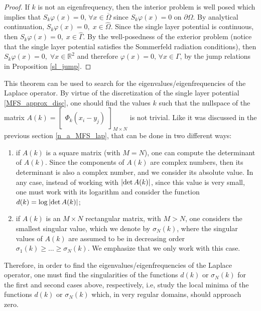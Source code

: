 \begin{proof}
    If \(k\) is not an eigenfrequency, then the interior problem is well posed which implies that \(S_k\varphi(x) = 0, \, \forall x \in \overline{\Omega}\) since \(S_k\varphi(x) = 0\) on \(\partial\Omega\). By analytical continuation, \(S_k\varphi(x) = 0, \; x \in \hat{\Omega}\). Since the single layer potential is continuous, then \(S_k\varphi(x) = 0, \; x \in \hat{\Gamma}\). By the well-posedness of the exterior problem (notice that the single layer potential satisfies the Sommerfeld radiation conditions), then \(S_k\varphi(x) = 0, \; \forall x \in \mathbb{R}^2\) and therefore \(\varphi(x) = 0, \, \forall x \in \Gamma\), by the jump relations in Proposition \ref{sl_jump}.
\end{proof}

This theorem can be used to search for the eigenvalues/eigenfrequencies of the Laplace operator. By virtue of the discretization of the single layer potential \eqref{MFS_approx_disc}, one should find the values \(k\) such that the nullspace of the matrix \(A(k) = \begin{bmatrix}
    \Phi_k(x_i - y_j)
\end{bmatrix}_{M \times N}\) is not trivial. Like it was discussed in the previous section \ref{n_a_MFS_lap}, that can be done in two different ways:
\begin{enumerate}
    \item if \(A(k)\) is a square matrix (with \(M=N\)), one can compute the determinant of \(A(k)\). Since the components of \(A(k)\) are complex numbers, then its determinant is also a complex number, and we consider its absolute value. In any case, instead of working with \(\abs{\determinant A(k)}\), since this value is very small, one must work with its logarithm and consider the function \(d(k) = \log \abs{\determinant A(k)}\);
    \item if \(A(k)\) is an \(M\times N\) rectangular matrix, with \(M > N\), one considers the smallest singular value, which we denote by \(\sigma_N(k)\), where the singular values of \(A(k)\) are assumed to be in decreasing order \(\sigma_1(k) \geq \dots \geq \sigma_N(k)\). We emphasize that we only work with this case.
\end{enumerate}
Therefore, in order to find the eigenvalues/eigenfrequencies of the Laplace operator, one must find the singularities of the functions \(d(k)\) or \(\sigma_N(k)\) for the first and second cases above, respectively, i.e, study the local minima of the functions \(d(k)\) or \(\sigma_N(k)\) which, in very regular domains, should approach zero.

